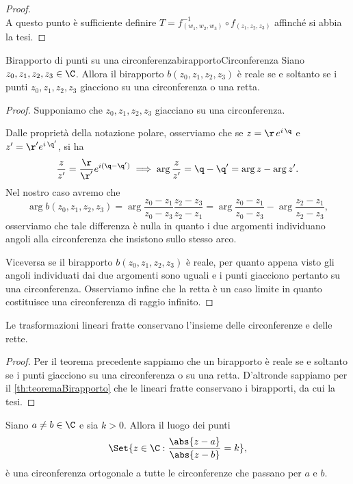 \begin{proof}
\[	\]
	A questo punto è sufficiente definire \(T = f^{-1}_{(w_1,w_2,w_3)} \circ f_{(z_1,z_2,z_3)}\) affinché si abbia la tesi.
\end{proof}

\begin{teor}{Birapporto di punti su una circonferenza}{birapportoCirconferenza}
	Siano \(z_0,z_1,z_2,z_3\in\C\).
	Allora il birapporto \(b(z_0,z_1,z_2,z_3)\) è reale se e soltanto se i punti \(z_0,z_1,z_2,z_3\) giacciono su una circonferenza o una retta.
\end{teor}

\begin{proof}
	\graffito{\(\Leftarrow)\)}Supponiamo che \(z_0,z_1,z_2,z_3\) giacciano su una circonferenza.

	Dalle proprietà della notazione polare, osserviamo che se \(z=\r\,e^{i\,\q}\) e \(z'=\r'e^{i\,\q'}\), si ha
	\[
		\frac{z}{z'} = \frac{\r}{\r'} e^{i(\q-\q')} \implies \arg \frac{z}{z'} = \q-\q' = \arg z - \arg z'.
	\]
	Nel nostro caso avremo che
	\[
		\arg b(z_0,z_1,z_2,z_3) = \arg \frac{z_0-z_1}{z_0-z_3}\frac{z_2-z_3}{z_2-z_1} = \arg \frac{z_0-z_1}{z_0-z_3} - \arg \frac{z_2-z_1}{z_2-z_3},
	\]
	osserviamo che tale differenza è nulla in quanto i due argomenti individuano angoli alla circonferenza che insistono sullo stesso arco.

	\graffito{\(\Rightarrow)\)}Viceversa se il birapporto \(b(z_0,z_1,z_2,z_3)\) è reale, per quanto appena visto gli angoli individuati dai due argomenti sono uguali e i punti giacciono pertanto su una circonferenza.
	Osserviamo infine che la retta è un caso limite in quanto costituisce una circonferenza di raggio infinito.
\end{proof}

\begin{cor}
	Le trasformazioni lineari fratte conservano l'insieme delle circonferenze e delle rette.
\end{cor}

\begin{proof}
	Per il teorema precedente sappiamo che un birapporto è reale se e soltanto se i punti giacciono su una circonferenza o su una retta.
	D'altronde sappiamo per il \autoref{th:teoremaBirapporto} che le lineari fratte conservano i birapporti, da cui la tesi.
\end{proof}

\begin{exeN}
	Siano \(a\neq b\in\C\) e sia \(k>0\).
	Allora il luogo dei punti
	\[
		\Set{z\in \C: \frac{\abs{z-a}}{\abs{z-b}}=k},
	\]
	è una circonferenza ortogonale a tutte le circonferenze che passano per \(a\) e \(b\).
\end{exeN}

